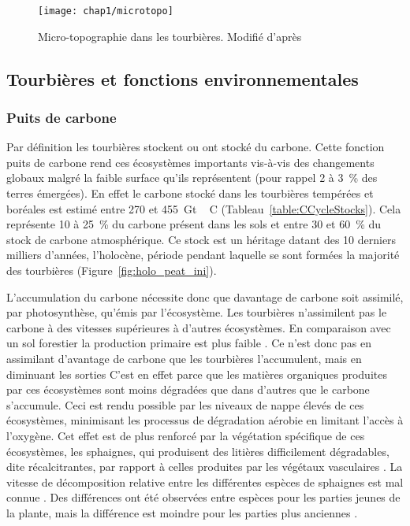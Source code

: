 \begin{figure}[t]
\centering
\texttt{[image: chap1/microtopo]}
\caption{Micro-topographie dans les tourbières. Modifié d'après \citet{rydin2013a}}
\label{fig:microtopo}
\end{figure}

\subsection{Tourbières et fonctions environnementales}

\subsubsection{Puits de carbone}
Par définition les tourbières stockent ou ont stocké du carbone.
Cette fonction puits de carbone rend ces écosystèmes importants vis-à-vis des changements globaux malgré la faible surface qu'ils représentent (pour rappel 2 à \SI{3}{\percent} des terres émergées).
En effet le carbone stocké dans les tourbières tempérées et boréales est estimé entre 270 et \SI{455}{\giga\tonne\,C} (Tableau~\ref{table:CCycleStocks}).
Cela représente 10 à \SI{25}{\percent} du carbone présent dans les sols et entre 30 et \SI{60}{\percent} du stock de carbone atmosphérique.
Ce stock est un héritage datant des 10 derniers milliers d'années, l'holocène, période pendant laquelle se sont formées la majorité des tourbières \citep{yu2010} (Figure~\ref{fig:holo_peat_ini}).

L'accumulation du carbone nécessite donc que davantage de carbone soit assimilé, par photosynthèse, qu'émis par l'écosystème.
Les tourbières n'assimilent pas le carbone à des vitesses supérieures à d'autres écosystèmes.
En comparaison avec un sol forestier la production primaire est plus faible \plop.
Ce n'est donc pas en assimilant d'avantage de carbone que les tourbières l'accumulent, mais en diminuant les sorties
C'est en effet parce que les matières organiques produites par ces écosystèmes sont moins dégradées que dans d'autres que le carbone s'accumule.
Ceci est rendu possible par les niveaux de nappe élevés de ces écosystèmes, minimisant les processus de dégradation aérobie en limitant l'accès à l'oxygène.
Cet effet est de plus renforcé par la végétation spécifique de ces écosystèmes, les sphaignes, qui produisent des litières difficilement dégradables, dite récalcitrantes, par rapport à celles produites par les végétaux vasculaires \citep{hobbie1996,liu2000}.
La vitesse de décomposition relative entre les différentes espèces de sphaignes est mal connue \citep{cornelissen2007}.
Des différences ont été observées entre espèces pour les parties jeunes de la plante, mais la différence est moindre pour les parties plus anciennes \citep{limpens2003}.

